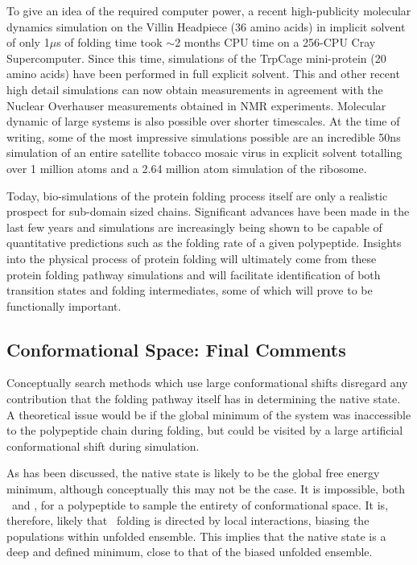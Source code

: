 To give an idea of the required computer power, a recent high-publicity molecular dynamics simulation on the Villin Headpiece (36 amino acids) in implicit
solvent of only 1$\mu$s of folding time took $\sim$2 months CPU time on a 256-CPU Cray Supercomputer\cite{COMPCHEM:Kol98}.
Since this time, simulations of the TrpCage mini-protein (20 amino acids) have been performed
in full explicit solvent\cite{SIMULATION:TRPCAGE:EXPLICIT}. This and other recent high detail simulations can now obtain measurements in agreement
with the Nuclear Overhauser measurements obtained in NMR experiments\cite{SIMULATION:TRPCAGE:IMPLICITNMR}.
Molecular dynamic of large systems is also possible over shorter timescales. At the time of writing, some of the most impressive simulations possible are an incredible 50ns simulation of an entire satellite tobacco mosaic virus in explicit solvent totalling over 1 million atoms\cite{SIMULATION:STMV} and a 2.64 million atom simulation of the ribosome\cite{SIMULATION:Ribosome}.

Today,  bio-simulations of the protein folding process itself are only a realistic prospect for sub-domain sized chains. Significant advances have been made in the last few years and simulations are increasingly being shown to be capable of quantitative predictions such as the folding rate of a given polypeptide\cite{SIMULATION:Snow05}.
Insights into  the physical process of protein folding will ultimately come from these protein folding pathway simulations and will facilitate identification of both transition states and folding intermediates, some of which will prove to be functionally important.





  
\subsection{Conformational Space: Final Comments}

Conceptually search methods which use large conformational shifts disregard any contribution that the folding pathway itself has in determining the native
state. A theoretical issue would be if the global minimum of the system was inaccessible to the polypeptide chain during folding, but could be visited by a large artificial conformational shift during simulation. 

As has been discussed, the native state is likely to be the global free energy minimum, although conceptually this may not be the case. It is impossible, both \insilico\ and \invivo, for a polypeptide to sample
the entirety of conformational space. It is, therefore, likely that \invivo\ folding is directed by local interactions, biasing
the populations within unfolded ensemble. This implies that the native state is a deep and defined minimum, close to that of the biased unfolded ensemble.

